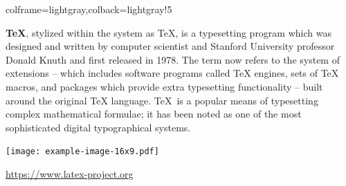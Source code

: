 \documentclass[11pt,a4paper]{ltxdoc}
\begin{document}
\begin{tcblisting}{colframe=lightgray,colback=lightgray!5}
\begin{BlueSkyPost}[width=12cm,account={\symbol{64}TeX.bluesky.social}]
\textbf{TeX}, stylized within the system as \TeX, is a typesetting program which was designed and written by computer scientist and Stanford University professor Donald Knuth and first released in 1978. The term now refers to the system of extensions – which includes software programs called TeX engines, sets of TeX macros, and packages which provide extra typesetting functionality – built around the original TeX language. \TeX\ is a popular means of typesetting complex mathematical formulae; it has been noted as one of the most sophisticated digital typographical systems.

\smallskip

\hfill\texttt{[image: example-image-16x9.pdf]}\hfill~

\smallskip

\url{https://www.latex-project.org}
\end{BlueSkyPost}
\end{tcblisting}
\end{document}
